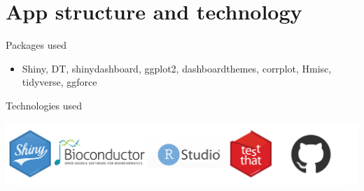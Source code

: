 \section{App structure and technology}


Packages used
\begin {itemize}
\item Shiny, DT, shinydashboard, ggplot2, dashboardthemes, corrplot, Hmisc, tidyverse, ggforce
\end{itemize}

Technologies used
\begin{center}
	\includegraphics[width=0.8\columnwidth]{./images/technologies.png}
\end{center}



